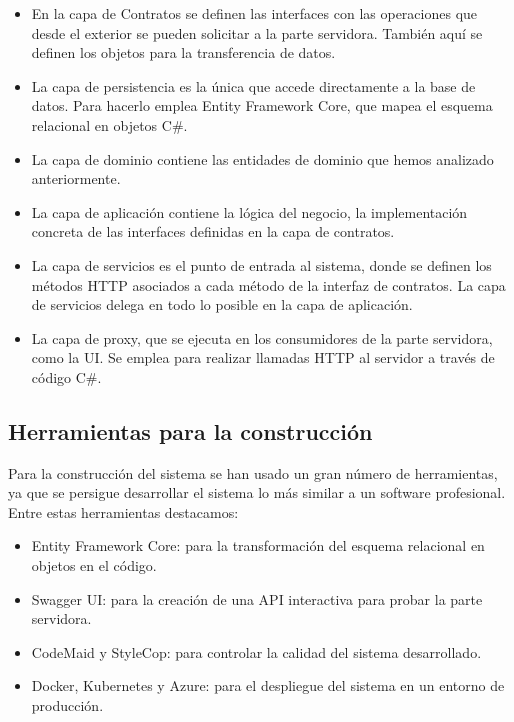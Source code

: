 \documentclass[11pt,a4paper]{article}
\begin{document}
\begin{itemize}

\item En la capa de Contratos se definen las interfaces con las operaciones que desde el exterior se pueden solicitar a la parte servidora. También aquí se definen los objetos para la transferencia de datos.

\item La capa de persistencia es la única que accede directamente a la base de datos. Para hacerlo emplea Entity Framework Core, que mapea el esquema relacional en objetos C\#.

\item La capa de dominio contiene las entidades de dominio que hemos analizado anteriormente.

\item La capa de aplicación contiene la lógica del negocio, la implementación concreta de las interfaces definidas en la capa de contratos.

\item La capa de servicios es el punto de entrada al sistema, donde se definen los métodos HTTP asociados a cada método de la interfaz de contratos. La capa de servicios delega en todo lo posible en la capa de aplicación.

\item La capa de proxy, que se ejecuta en los consumidores de la parte servidora, como la UI. Se emplea para realizar llamadas HTTP al servidor a través de código C\#.

\end{itemize}

\subsection{Herramientas para la construcción}

Para la construcción del sistema se han usado un gran número de herramientas, ya que se persigue desarrollar el sistema lo más similar a un software profesional. Entre estas herramientas destacamos:

\begin{itemize}

\item Entity Framework Core: para la transformación del esquema relacional en objetos en el código.

\item Swagger UI: para la creación de una API interactiva para probar la parte servidora.

\item CodeMaid y StyleCop: para controlar la calidad del sistema desarrollado.

\item Docker, Kubernetes y Azure: para el despliegue del sistema en un entorno de producción.

\end{itemize}
\end{document}

